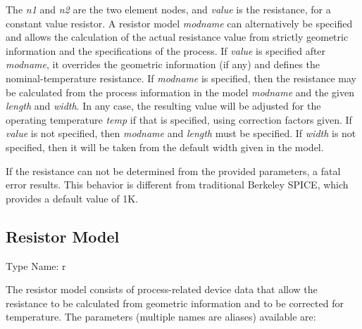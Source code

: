 The {\it n1} and {\it n2} are the two element nodes, and {\it value}
is the resistance, for a constant value resistor.  A resistor model
{\it modname} can alternatively be specified and allows the
calculation of the actual resistance value from strictly geometric
information and the specifications of the process.  If {\it value} is
specified after {\it modname}, it overrides the geometric information
(if any) and defines the nominal-temperature resistance.  If {\it
modname} is specified, then the resistance may be calculated from the
process information in the model {\it modname} and the given {\it
length} and {\it width}.  In any case, the resulting value will be
adjusted for the operating temperature {\it temp} if that is
specified, using correction factors given.  If {\it value} is not
specified, then {\it modname} and {\it length} must be specified.  If
{\it width} is not specified, then it will be taken from the default
width given in the model.

If the resistance can not be determined from the provided parameters,
a fatal error results.  This behavior is different from traditional
Berkeley SPICE, which provides a default value of 1K.

\subsection{Resistor Model}
\label{resmodel}


{\cb Type Name:} {\vt r}

The resistor model consists of process-related device data that allow
the resistance to be calculated from geometric information and to be
corrected for temperature.  The parameters (multiple names are aliases)
available are:

